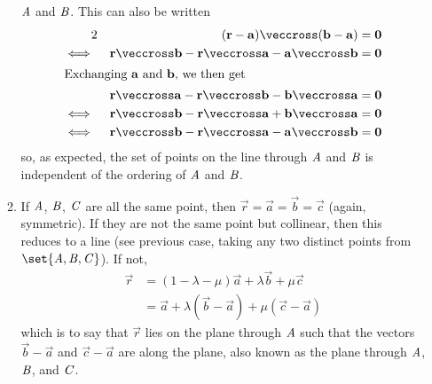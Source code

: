 \documentclass[fleqn,a4paper,11pt]{article}
\begin{document}
\begin{enumerate}
\begin{enumerate}
      \(\mathit{A}\) and \(\mathit{B}\). This can also be written
      \begin{alignat*}2
       && (\vec r - \vec a) \veccross (\vec b - \vec a) &= \vec 0 \\
       \iff{}&& \vec r \veccross \vec b - \vec r \veccross \vec a
                - \vec a \veccross \vec b &= \vec 0 \\
      \intertext{Exchanging \(\vec a\) and \(\vec b\), we then get}
       && \vec r \veccross \vec a - \vec r \veccross \vec b
                - \vec b \veccross \vec a &= \vec 0 \\
       \iff{}&& \vec r \veccross \vec b - \vec r \veccross \vec a
                + \vec b \veccross \vec a &= \vec 0 \\
       \iff{}&& \vec r \veccross \vec b - \vec r \veccross \vec a
                - \vec a \veccross \vec b &= \vec 0
      \end{alignat*}
      so, as expected, the set of points on the line through \(\mathit{A}\) and
      \(\mathit{B}\) is independent of the ordering of \(\mathit{A}\) and \(\mathit{B}\).
     \item
      If \(\mathit{A}\), \(\mathit{B}\), \(\mathit{C}\) are all the same point, then
      \(\vec r = \vec a = \vec b = \vec c\) (again, symmetric). If they are not
      the same point but collinear, then this reduces to a line (see previous
      case, taking any two distinct points
      from \(\set{\pnt A, \pnt B, \pnt C}\)). If not,
      \begin{align*}
       \vec r &= (1 - \lambda - \mu)\vec a + \lambda \vec b + \mu \vec c \\
              &= \vec a + \lambda(\vec b - \vec a) + \mu (\vec c - \vec a)
      \end{align*}
      which is to say that \(\vec r\) lies on the plane through \(\mathit{A}\) such
      that the vectors \(\vec b - \vec a\) and \(\vec c - \vec a\) are along the
      plane, also known as the plane through \(\mathit{A}\), \(\mathit{B}\), and
      \(\mathit{C}\).


\end{enumerate}
\end{enumerate}
\end{document}
